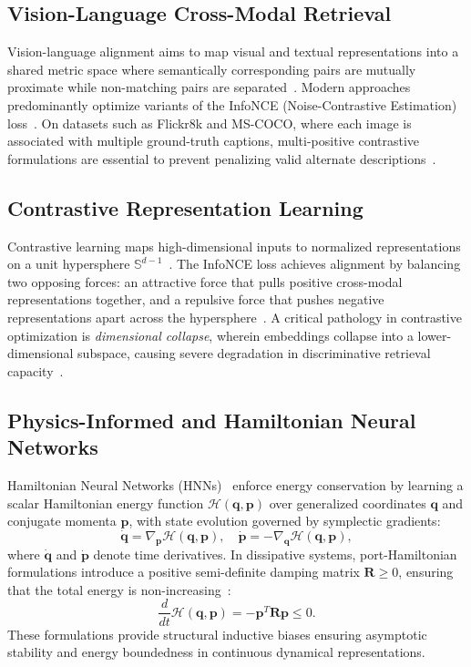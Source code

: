 \documentclass[10pt,journal,final]{IEEEtran}
\begin{document}
\subsection{Vision-Language Cross-Modal Retrieval}
Vision-language alignment aims to map visual and textual representations into a shared metric space where semantically corresponding pairs are mutually proximate while non-matching pairs are separated~\cite{radford2021learning,wang2016comprehensive}. Modern approaches predominantly optimize variants of the InfoNCE (Noise-Contrastive Estimation) loss~\cite{oord2018representation,chen2020simple,he2020momentum}. On datasets such as Flickr8k and MS-COCO, where each image is associated with multiple ground-truth captions, multi-positive contrastive formulations are essential to prevent penalizing valid alternate descriptions~\cite{hodosh2013framing}.

\subsection{Contrastive Representation Learning}
Contrastive learning maps high-dimensional inputs to normalized representations on a unit hypersphere $\mathbb{S}^{d-1}$~\cite{chen2020simple,he2020momentum}. The InfoNCE loss achieves alignment by balancing two opposing forces: an attractive force that pulls positive cross-modal representations together, and a repulsive force that pushes negative representations apart across the hypersphere~\cite{wang2020understanding}. A critical pathology in contrastive optimization is \textit{dimensional collapse}, wherein embeddings collapse into a lower-dimensional subspace, causing severe degradation in discriminative retrieval capacity~\cite{jing2022understanding}.

\subsection{Physics-Informed and Hamiltonian Neural Networks}
Hamiltonian Neural Networks (HNNs)~\cite{greydanus2019hamiltonian} enforce energy conservation by learning a scalar Hamiltonian energy function $\mathcal{H}(\mathbf{q}, \mathbf{p})$ over generalized coordinates $\mathbf{q}$ and conjugate momenta $\mathbf{p}$, with state evolution governed by symplectic gradients:
\begin{equation}
\label{eq:prior_hamiltonian}
\dot{\mathbf{q}} = \nabla_{\mathbf{p}} \mathcal{H}(\mathbf{q}, \mathbf{p}), \quad \dot{\mathbf{p}} = -\nabla_{\mathbf{q}} \mathcal{H}(\mathbf{q}, \mathbf{p}),
\end{equation}
where $\dot{\mathbf{q}}$ and $\dot{\mathbf{p}}$ denote time derivatives. In dissipative systems, port-Hamiltonian formulations introduce a positive semi-definite damping matrix $\mathbf{R} \ge 0$, ensuring that the total energy is non-increasing~\cite{vanderschaft2000}:
\begin{equation}
\label{eq:prior_dissipative}
\frac{d}{dt}\mathcal{H}(\mathbf{q}, \mathbf{p}) = -\mathbf{p}^T \mathbf{R} \mathbf{p} \le 0.
\end{equation}
These formulations provide structural inductive biases ensuring asymptotic stability and energy boundedness in continuous dynamical representations.
\end{document}
